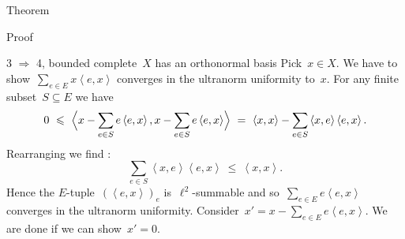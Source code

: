 \documentclass[b]{subfiles}
\begin{document}
\begin{parsec}
\begin{point}{Theorem}
\begin{point}{Proof}
\begin{point}{3
    $\Rightarrow$ 4, bounded complete~$X$ has an orthonormal basis}
Pick~$x \in X$.
We have to show~$\sum_{e \in E} x\left<e,x\right>$
converges in the ultranorm uniformity to~$x$.
For any finite subset~$S \subseteq E$ we have
\begin{equation*}
    0\  \leq\  \Bigl< x - \sum_{e \in S} e\left<e,x\right>,
        x - \sum_{e \in S} e\left<e,x\right> \Bigr>
       \  =\  \left<x,x\right> - \sum_{e \in S} \left<x,e\right>\left<e,x\right>.
\end{equation*}
Rearranging we find :
\begin{equation*}
\sum_{e \in S} \left<x,e\right>\left<e,x\right>
   \  \leq \ \left<x,x\right>.
\end{equation*}
Hence the $E$-tuple~$(\left<e,x\right>)_e$
is~$\ell^2$-summable
and so~$\sum_{e \in E} e \left<e,x\right>$
converges in the ultranorm uniformity.
Consider~$x' = x - \sum_{e \in E} e\left<e,x\right>$.
We are done if we can show~$x' = 0$.


\end{point}
\end{point}
\end{point}
\end{parsec}
\end{document}
